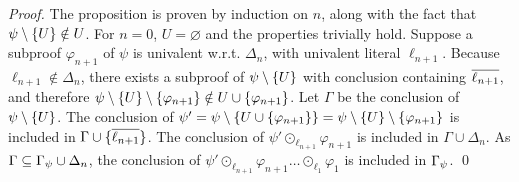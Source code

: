 \begin{proof}
The proposition is proven by induction on $n$, along with the fact that $\psi \setminus \{U\} \notin U$.
For $n = 0$, $U = \varnothing$ and the properties trivially hold. Suppose a subproof
$\varphi_{n+1}$ of $\psi$ is univalent w.r.t. $\Delta_n$, with univalent literal $\ell_{n+1}$.
Because $\ell_{n+1} \notin \Delta_n$, there exists a subproof of $\psi \setminus \{U\}$ with conclusion
containing $\overline{\ell_{n+1}}$, and therefore $\psi \setminus \{U\} \setminus \{\varphi_{n+1}\} \notin U \cup
\{\varphi_{n+1}\}$.  Let $\Gamma$ be the conclusion of $\psi \setminus \{U\}$. The conclusion of $ \psi' =
\psi \setminus \{U \cup \{\varphi_{n+1}\}\} = \psi \setminus \{U\} \setminus \{\varphi_{n+1}\} $ is included in $\Gamma \cup
\{\overline{\ell_{n+1}}\}$. The conclusion of $\psi' \odot_{\ell_{n+1}} \varphi_{n+1}$ is included in
$\Gamma \cup \Delta_n$. As $\Gamma \subseteq \Gamma_{\psi} \cup \Delta_n$, the conclusion of
$\psi' \odot_{\ell_{n+1}} \varphi_{n+1} \ldots \odot_{\ell_1} \varphi_1$ is included in
$\Gamma_{\psi}$. \qed
\end{proof}












